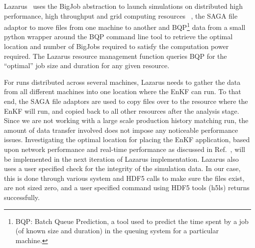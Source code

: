 \documentclass{acm_proc_article-sp}
\newcommand{\jhanote}[1]{ {\textcolor{red} { ***Jha: #1 }}}
\newcommand{\yyenote}[1]{ {\textcolor{blue} { ***yye00: #1 }}}
\newcommand{\jhanote}[1]{}
\newcommand{\yyenote}[1]{}
\begin{document}



Lazarus~\cite{gmac} uses the BigJob abstraction to launch simulations on
distributed high performance, high throughput and grid computing
resources ~\cite{gmac}, the SAGA file adaptor to move files from one
machine to another and BQP\footnote{BQP: Batch Queue Prediction, a tool
used to predict the time spent by a job (of known size and duration)
in the queuing system for a particular machine.} data from a small python wrapper around the
BQP command line tool to retrieve the optimal location and number of
BigJobs required to satisfy the computation power required. The Lazarus
resource management function queries BQP for the ``optimal'' job size
and duration for any given resource.

For runs distributed across several machines, Lazarus needs to gather
the data from all different machines into one location where the EnKF
can run. To that end, the SAGA file adaptors are used to copy files
over to the resource where the EnKF will run, and copied back to all
other resources after the analysis stage. Since we are not working
with a large scale production history matching run, the amount of data
transfer involved does not impose any noticeable performance
issues. Investigating the optimal location for placing the
EnKF application, based upon network performance and real-time
performance as discussed in Ref.~\cite{escience07}, will be implemented
in the next iteration of Lazarus implementation.  Lazarus also uses
a user specified check for the integrity of the simulation data. In
our case, this is done through various system and HDF5 calls to make
sure the files exist, are not sized zero, and a user specified command
using HDF5 tools (h5ls) returns successfully.
\end{document}
